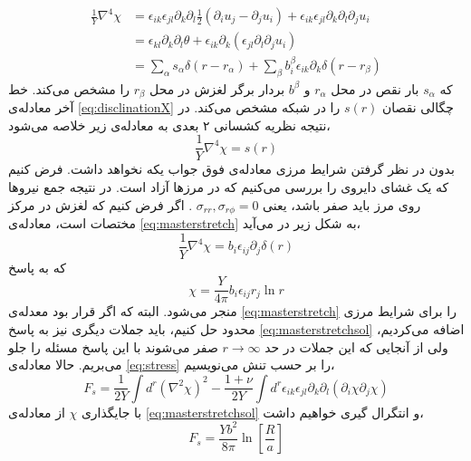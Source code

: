 \begin{equation}
\begin{aligned}
\frac{1}{Y}\nabla^4\chi&=\epsilon_{ik}\epsilon_{jl}\partial_k\partial_l\frac{1}{2}(\partial_iu_j-\partial_ju_i)+\epsilon_{ik}\epsilon_{jl}\partial_k\partial_l\partial_ju_i\\
&=\epsilon_{kl}\partial_k\partial_l\theta+ \epsilon_{ik}\partial_k(\epsilon_{jl}\partial_l\partial_ju_i)\\
&=\sum_{\alpha}s_\alpha\delta(r-r_\alpha)+\sum_\beta b_i^\beta\epsilon_{ik}\partial_k\delta(r-r_\beta)
\label{eq:disclination}
\end{aligned}
\end{equation}
که $s_\alpha$
بار نقص در محل $r_\alpha$
و $b^\beta$
بردار برگر لغزش در محل $r_\beta$
را مشخص می‌کند. خط آخر معادله‌ی 
\ref{eq:disclinationX}
چگالی نقصان
$s(r)$
 را در شبکه مشخص می‌کند. در نتیجه نظریه کشسانی ۲ بعدی به معادله‌ی زیر خلاصه می‌شود،
\begin{equation}
\frac{1}{Y}\nabla^4\chi=s(r)
\label{eq:masterstretch}
\end{equation}
بدون در نظر گرفتن شرایط مرزی معادله‌ی فوق جواب یکه نخواهد داشت. فرض کنیم که یک غشای دایروی را بررسی می‌کنیم که در مرز‌ها آزاد است. در نتیجه جمع نیرو‌ها روی مرز باید صفر باشد، یعنی 
$\sigma_{rr},\sigma_{r\phi}=0$
. اگر فرض کنیم که لغزش در مرکز مختصات است، معادله‌ی 
\ref{eq:masterstretch}
به شکل زیر در می‌آید،
\begin{equation}
\frac{1}{Y}\nabla^4\chi=b_i\epsilon_{ij}\partial_j\delta(r)
\end{equation}
که به پاسخ
\begin{equation}
\chi=\frac{Y}{4\pi}b_i\epsilon_{ij}r_j\ln r
\label{eq:masterstretchsol}
\end{equation}
منجر می‌شود. البته که اگر قرار بود معدله‌ی 
\ref{eq:masterstretch}
را برای شرایط مرزی محدود حل کنیم،‌ باید جملات دیگری نیز به پاسخ 
\ref{eq:masterstretchsol}
اضافه می‌کردیم، ولی از آنجایی که این جملات در حد 
$r\rightarrow\infty$
صفر می‌شوند با این پاسخ مسئله‌ را جلو می‌بریم. حالا معادله‌ی 
\ref{eq:stress}
را بر حسب تنش می‌نویسیم،
\begin{equation}
F_s=\frac{1}{2Y}\int d^r(\nabla^2\chi)^2-\frac{1+\nu}{2Y}\int d^r\epsilon_{ik}\epsilon_{jl}\partial_k\partial_l(\partial_i\chi\partial_j\chi)
\end{equation}
با جایگذاری $\chi$ از معادله‌ی
\ref{eq:masterstretchsol}
و انتگرال گیری خواهیم داشت،
\begin{equation}
F_s=\frac{Yb^2}{8\pi}\ln\left[\frac{R}{a}\right]
\end{equation}
